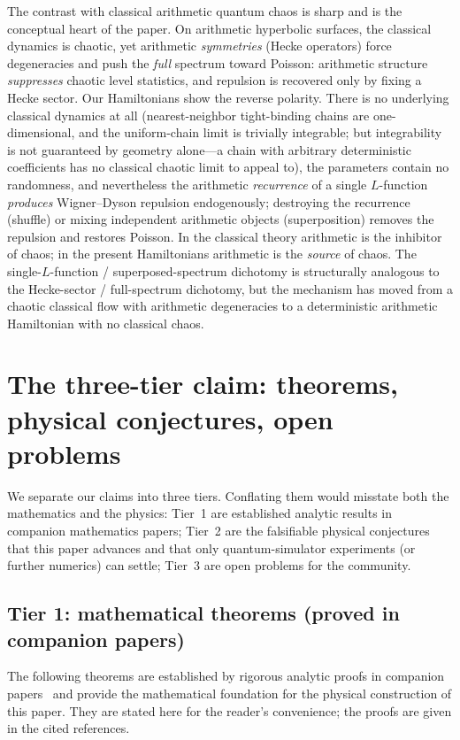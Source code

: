 \documentclass[aps,prx,reprint,floatfix]{revtex4-2}
\begin{document}
The contrast with classical arithmetic quantum chaos is sharp and is the
conceptual heart of the paper. On arithmetic hyperbolic surfaces, the
classical dynamics is chaotic, yet arithmetic \emph{symmetries} (Hecke
operators) force degeneracies and push the \emph{full} spectrum toward
Poisson: arithmetic structure \emph{suppresses} chaotic level statistics,
and repulsion is recovered only by fixing a Hecke sector. Our Hamiltonians
show the reverse polarity. There is no underlying classical dynamics at all
(nearest-neighbor tight-binding chains are one-dimensional, and the
uniform-chain limit is trivially integrable; but integrability is not
guaranteed by geometry alone---a chain with arbitrary deterministic
coefficients has no classical chaotic limit to appeal to), the parameters
contain no randomness, and nevertheless the arithmetic
\emph{recurrence} of a single $L$-function \emph{produces} Wigner--Dyson
repulsion endogenously; destroying the recurrence (shuffle) or mixing
independent arithmetic objects (superposition) removes the repulsion and
restores Poisson. In the classical theory arithmetic is the inhibitor of
chaos; in the present Hamiltonians arithmetic is the \emph{source} of
chaos. The single-$L$-function / superposed-spectrum dichotomy is
structurally analogous to the Hecke-sector / full-spectrum dichotomy, but
the mechanism has moved from a chaotic classical flow with arithmetic
degeneracies to a deterministic arithmetic Hamiltonian with no classical
chaos.

\section{The three-tier claim: theorems, physical conjectures, open problems}
\label{sec:hypo}

We separate our claims into three tiers. Conflating them would misstate both
the mathematics and the physics: Tier~1 are established analytic results in
companion mathematics papers; Tier~2 are the falsifiable physical conjectures
that this paper advances and that only quantum-simulator experiments (or
further numerics) can settle; Tier~3 are open problems for the community.

\subsection{Tier 1: mathematical theorems (proved in companion papers)}

The following theorems are established by rigorous analytic proofs in
companion papers~\cite{chen2026rh,chen2026grh} and provide the mathematical
foundation for the physical construction of this paper. They are stated here
for the reader's convenience; the proofs are given in the cited references.
\end{document}
